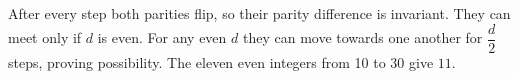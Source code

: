 After every step both parities flip, so their parity difference is invariant. They can meet only if $d$ is even. For any even $d$ they can move towards one another for $\dfrac{d}{2}$ steps, proving possibility. The eleven even integers from 10 to 30 give $\boxed{11}$.
